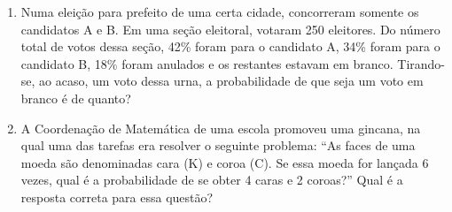 \documentclass[a4paper]{article}
\begin{document}
\begin{enumerate}
		\item Numa eleição para prefeito de uma certa
		cidade, concorreram somente os candidatos A e B. Em
		uma seção eleitoral, votaram 250 eleitores. Do número
		total de votos dessa seção, 42\% foram para o candidato A, 34\% foram para o candidato B, 18\% foram anulados e os restantes estavam em branco. Tirando-se, ao acaso, um voto dessa urna, a probabilidade de que seja um voto em branco é de quanto?
		
		\item A Coordenação de Matemática de uma
		escola promoveu uma gincana, na qual uma das tarefas
		era resolver o seguinte problema:
		“As faces de uma moeda são denominadas cara (K) e
		coroa (C). Se essa moeda for lançada 6 vezes, qual é a probabilidade de se obter 4 caras e 2 coroas?”
		Qual é a resposta correta para essa questão?
	\end{enumerate}			
\end{document}
